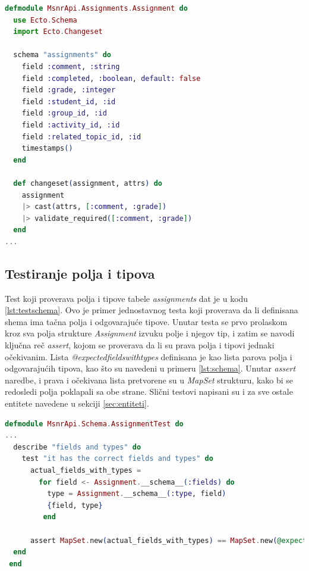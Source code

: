 \documentclass[12pt,oneside]{memoir}
\begin{document}
\begin{lstlisting}[language=elixir, caption={Shema tabele \emph{assignments}},captionpos=b, label={lst:schema}]
defmodule MsnrApi.Assignments.Assignment do
  use Ecto.Schema
  import Ecto.Changeset

  schema "assignments" do
    field :comment, :string
    field :completed, :boolean, default: false
    field :grade, :integer
    field :student_id, :id
    field :group_id, :id
    field :activity_id, :id
    field :related_topic_id, :id
    timestamps()
  end

  def changeset(assignment, attrs) do
    assignment
    |> cast(attrs, [:comment, :grade])
    |> validate_required([:comment, :grade])
  end
...
\end{lstlisting}

\subsection{Testiranje polja i tipova}
\par Test koji proverava polja i tipove tabele \emph{assignments} dat je u kodu \ref{lst:testschema}. Ovo je primer jednostavnog testa koji proverava da li definisana shema ima tačna polja i odgovarajuće tipove. Unutar testa se prvo prolaskom kroz sva polja strukture \emph{Assignment} izvuku polje i njegov tip, i zatim se navodi ključna reč \emph{assert}, kojom se proverava da li su prava polja i tipovi jednaki očekivanim. Lista \emph{@expected{\textunderscore}fields{\textunderscore}with{\textunderscore}types} definisana je kao lista parova polja i odgovarajućih tipova, kao što su navedeni u primeru \ref{lst:schema}. Unutar \emph{assert} naredbe, i prava i očekivana lista pretvorene su u \emph{MapSet} strukturu, kako bi se redosledi polja poklapali sa obe strane. Slični testovi napisani su i za sve ostale entitete navedene u sekciji \ref{sec:entiteti}.

\begin{lstlisting}[language=elixir, caption={Test za proveru polja i tipova tabele \emph{assignments}},captionpos=b, label={lst:testschema}]
defmodule MsnrApi.Schema.AssignmentTest do
...  
  describe "fields and types" do
    test "it has the correct fields and types" do
      actual_fields_with_types =
        for field <- Assignment.__schema__(:fields) do
          type = Assignment.__schema__(:type, field)
          {field, type}
         end
    
      assert MapSet.new(actual_fields_with_types) == MapSet.new(@expected_fields_with_types)
  end
 end
\end{lstlisting}
\end{document}
